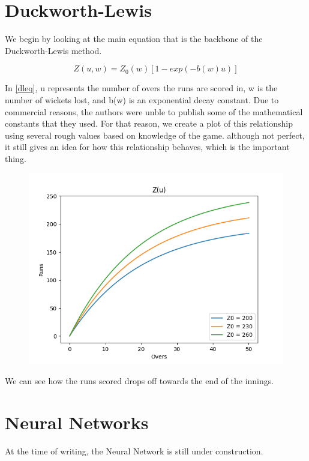 \documentclass[11pt]{amsart}
\begin{document}
\section{Duckworth-Lewis}
We begin by looking at the main equation that is the backbone of the Duckworth-Lewis method.

\begin{equation}
    \label{dleq}
    Z(u,w) = Z_0(w)[1-exp(-b(w)u)]
\end{equation}

In \ref{dleq}, u represents the number of overs the runs are scored in, w is the number of wickets lost, and b(w) is an exponential decay constant.
Due to commercial reasons, the authors were unble to publish some of the mathematical constants that they used. For that reason, we create a plot of this relationship
using several rough values based on knowledge of the game. although not perfect, it still gives an idea for how this relationship behaves, which is the important thing.

\begin{figure}
    \includegraphics[scale=0.6]{../Thesis/figures/z(u).png}
\end{figure}

We can see how the runs scored drops off towards the end of the innings. 

\section{Neural Networks}
At the time of writing, the Neural Network is still under construction.

{}

\end{document}
